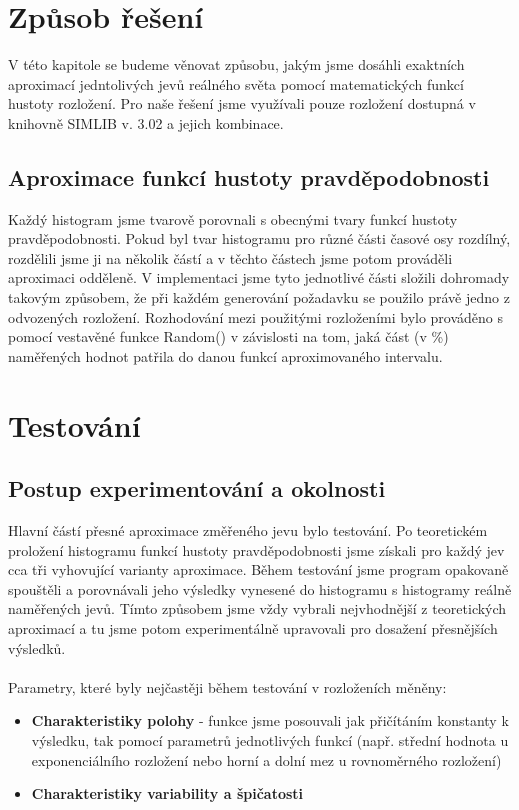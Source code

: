 \documentclass[12pt,a4paper]{article}
\begin{document}
\section{Způsob řešení}
V této kapitole se budeme věnovat způsobu, jakým jsme dosáhli exaktních aproximací jedntolivých jevů 
reálného světa pomocí matematických funkcí hustoty rozložení. Pro naše řešení jsme využívali pouze rozložení
dostupná v knihovně SIMLIB v. 3.02 a jejich kombinace.

	\subsection{Aproximace funkcí hustoty pravděpodobnosti} 
	Každý histogram jsme tvarově porovnali s obecnými tvary funkcí hustoty pravděpodobnosti. Pokud byl tvar histogramu pro
	různé části časové osy rozdílný, rozdělili jsme ji na několik částí a v těchto částech jsme potom prováděli aproximaci 
	odděleně. V implementaci jsme tyto jednotlivé části složili dohromady takovým způsobem, že při každém generování požadavku 
	se použilo právě jedno z odvozených rozložení. Rozhodování mezi použitými rozloženími bylo prováděno s pomocí vestavěné
	funkce Random() v závislosti na tom, jaká část (v \%) naměřených hodnot patřila do danou funkcí aproximovaného intervalu.



\section{Testování}
	\subsection{Postup experimentování a okolnosti}
	Hlavní částí přesné aproximace změřeného jevu bylo testování. Po teoretickém proložení histogramu funkcí hustoty pravděpodobnosti jsme získali pro každý jev cca tři vyhovující varianty aproximace. Během testování jsme program opakovaně spouštěli a porovnávali jeho
	výsledky vynesené do histogramu s histogramy reálně naměřených jevů. Tímto způsobem jsme vždy vybrali nejvhodnější z teoretických
	aproximací a tu jsme potom experimentálně upravovali pro dosažení přesnějších výsledků. \\ \\
	Parametry, které byly nejčastěji během testování v rozloženích měněny:
	\begin{itemize}
		\item \textbf{Charakteristiky polohy} - funkce jsme posouvali jak přičítáním konstanty k výsledku, tak pomocí parametrů jednotlivých 
		funkcí (např. střední hodnota u exponenciálního rozložení nebo horní a dolní mez u rovnoměrného rozložení)
		\item \textbf{Charakteristiky variability a špičatosti}
	\end{itemize}
\end{document}
